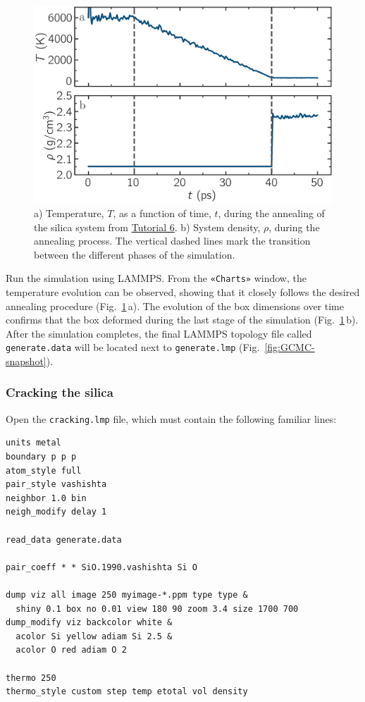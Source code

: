 \documentclass[9pt,tutorial]{livecoms}
\newcommand{\flecmd}[1]{\textcolor{command}{\texttt{#1}}} %
\newcommand{\guicmd}[1]{\textcolor{command}{\texttt{«#1»}}} %
\begin{document}
\begin{figure}
\centering
\includegraphics[width=\linewidth]{GCMC-dimension}
\caption{a) Temperature, $T$, as a function of time, $t$, during the annealing
of the silica system from \hyperref[gcmc-silica-label]{Tutorial 6}.
b) System density, $\rho$, during the annealing process.  The vertical dashed lines
mark the transition between the different phases of the simulation.}
\label{fig:GCMC-dimension}
\end{figure}

Run the simulation using LAMMPS.  From the \guicmd{Charts} window, the temperature
evolution can be observed, showing that it closely follows the desired annealing procedure (Fig.~\ref{fig:GCMC-dimension}\,a).
The evolution of the box dimensions over time confirms that the box
deformed during the last stage of the simulation
(Fig.~\ref{fig:GCMC-dimension}\,b).  After the simulation completes, the final
LAMMPS topology file called \flecmd{generate.data}
will be located next to \flecmd{generate.lmp} (Fig.~\ref{fig:GCMC-snapshot}).

\subsubsection{Cracking the silica}

Open the \flecmd{cracking.lmp} file, which must contain the following familiar lines:
\begin{lstlisting}
units metal
boundary p p p
atom_style full
pair_style vashishta
neighbor 1.0 bin
neigh_modify delay 1

read_data generate.data

pair_coeff * * SiO.1990.vashishta Si O

dump viz all image 250 myimage-*.ppm type type &
  shiny 0.1 box no 0.01 view 180 90 zoom 3.4 size 1700 700
dump_modify viz backcolor white &
  acolor Si yellow adiam Si 2.5 &
  acolor O red adiam O 2

thermo 250
thermo_style custom step temp etotal vol density
\end{lstlisting}
\end{document}
